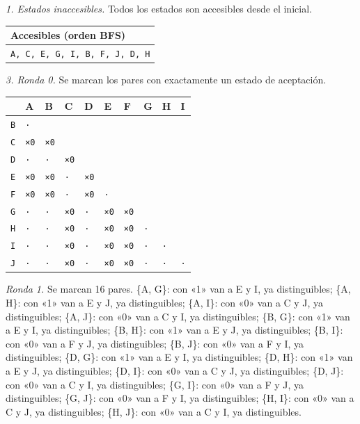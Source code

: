 \documentclass[11pt]{article}
\begin{document}
\textit{1. Estados inaccesibles.} Todos los estados son accesibles desde el inicial.
\begin{center}\footnotesize\begin{tabular}{l}\toprule
Accesibles (orden BFS) \\\midrule
\texttt{A, C, E, G, I, B, F, J, D, H} \\
\bottomrule\end{tabular}\end{center}
\textit{3. Ronda 0.} Se marcan los pares con exactamente un estado de aceptación.
\begin{center}\footnotesize\begin{tabular}{llllllllll}\toprule
 & A & B & C & D & E & F & G & H & I \\\midrule
\texttt{B} & \texttt{·} & \texttt{} & \texttt{} & \texttt{} & \texttt{} & \texttt{} & \texttt{} & \texttt{} & \texttt{} \\
\texttt{C} & \texttt{×0} & \texttt{×0} & \texttt{} & \texttt{} & \texttt{} & \texttt{} & \texttt{} & \texttt{} & \texttt{} \\
\texttt{D} & \texttt{·} & \texttt{·} & \texttt{×0} & \texttt{} & \texttt{} & \texttt{} & \texttt{} & \texttt{} & \texttt{} \\
\texttt{E} & \texttt{×0} & \texttt{×0} & \texttt{·} & \texttt{×0} & \texttt{} & \texttt{} & \texttt{} & \texttt{} & \texttt{} \\
\texttt{F} & \texttt{×0} & \texttt{×0} & \texttt{·} & \texttt{×0} & \texttt{·} & \texttt{} & \texttt{} & \texttt{} & \texttt{} \\
\texttt{G} & \texttt{·} & \texttt{·} & \texttt{×0} & \texttt{·} & \texttt{×0} & \texttt{×0} & \texttt{} & \texttt{} & \texttt{} \\
\texttt{H} & \texttt{·} & \texttt{·} & \texttt{×0} & \texttt{·} & \texttt{×0} & \texttt{×0} & \texttt{·} & \texttt{} & \texttt{} \\
\texttt{I} & \texttt{·} & \texttt{·} & \texttt{×0} & \texttt{·} & \texttt{×0} & \texttt{×0} & \texttt{·} & \texttt{·} & \texttt{} \\
\texttt{J} & \texttt{·} & \texttt{·} & \texttt{×0} & \texttt{·} & \texttt{×0} & \texttt{×0} & \texttt{·} & \texttt{·} & \texttt{·} \\
\bottomrule\end{tabular}\end{center}
\textit{Ronda 1.} Se marcan 16 pares. \{A, G\}: con «1» van a E y I, ya distinguibles; \{A, H\}: con «1» van a E y J, ya distinguibles; \{A, I\}: con «0» van a C y J, ya distinguibles; \{A, J\}: con «0» van a C y I, ya distinguibles; \{B, G\}: con «1» van a E y I, ya distinguibles; \{B, H\}: con «1» van a E y J, ya distinguibles; \{B, I\}: con «0» van a F y J, ya distinguibles; \{B, J\}: con «0» van a F y I, ya distinguibles; \{D, G\}: con «1» van a E y I, ya distinguibles; \{D, H\}: con «1» van a E y J, ya distinguibles; \{D, I\}: con «0» van a C y J, ya distinguibles; \{D, J\}: con «0» van a C y I, ya distinguibles; \{G, I\}: con «0» van a F y J, ya distinguibles; \{G, J\}: con «0» van a F y I, ya distinguibles; \{H, I\}: con «0» van a C y J, ya distinguibles; \{H, J\}: con «0» van a C y I, ya distinguibles.
\end{document}
